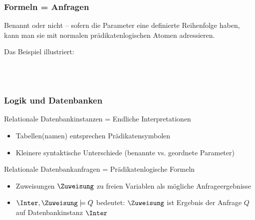\documentclass[aspectratio=1610,onlymath]{beamer}
\begin{document}
\begin{frame}\frametitle{Formeln = Anfragen}

Benannt oder nicht -- sofern die Parameter eine definierte Reihenfolge haben,
kann man sie mit normalen prädikatenlogischen Atomen adressieren.\medskip

\pause

Das Beispiel illustriert:
\begin{center}
\large
{}\\[1ex]
\\
\end{center}
\end{frame}

\begin{frame}\frametitle{Logik und Datenbanken}

\alert{Relationale Datenbankinstanzen = Endliche Interpretationen}
\begin{itemize}
\item Tabellen(namen) entsprechen Prädikatensymbolen
\item Kleinere syntaktische Unterschiede (benannte vs. geordnete Parameter)
\end{itemize}

\alert{Relationale Datenbankanfragen = Prädikatenlogische Formeln}
\begin{itemize}
\item Zuweisungen $\Zuweisung$ zu freien Variablen als mögliche Anfrageergebnisse
\item $\Inter,\Zuweisung\models Q$ bedeutet: $\Zuweisung$ ist Ergebnis der Anfrage $Q$ auf Datenbankinstanz $\Inter$
\end{itemize}


\end{frame}
\end{document}
